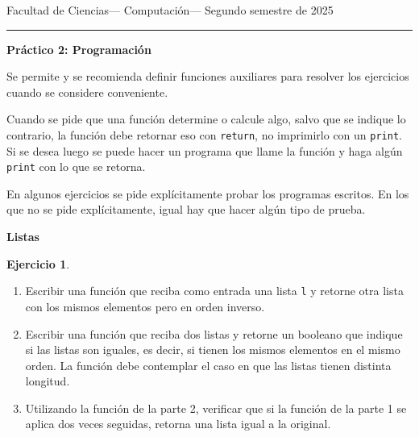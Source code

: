 \documentclass[a4paper,12pt]{book}
\theoremstyle{definition}
\newtheorem{ejercicio}{Ejercicio}
\begin{document}
	
	\noindent
	\centerline{\sc
		Facultad de Ciencias\hfill---\hfill
		Computación\hfill---\hfill
		Segundo semestre de 2025}\smallbreak\hrule
	
	\bigbreak
	\centerline{\Large\textbf{Práctico 2: Programación}}
	\bigbreak
	
	Se permite y se recomienda definir funciones auxiliares para resolver los ejercicios cuando se considere conveniente.
	
	Cuando se pide que una función determine o calcule algo, salvo que se indique lo contrario, la función debe retornar eso con {\tt return}, no imprimirlo con un {\tt print}. Si se desea luego se puede hacer un programa que llame la función y haga algún {\tt print} con lo que se retorna.
	
	En algunos ejercicios se pide explícitamente probar los programas escritos. En los que no se pide explícitamente, igual hay que hacer algún tipo de prueba.
	
	\begin{center}
		{\textbf{Listas}}
	\end{center}
	
	\begin{ejercicio}
		\begin{enumerate}
			\item Escribir una función que reciba como entrada una lista {\tt l} y retorne otra lista con los mismos elementos pero en orden inverso.
			
			\item Escribir una función que reciba dos listas y retorne un booleano que indique si las listas son iguales, es decir, si tienen los mismos elementos en el mismo orden. La función debe contemplar el caso en que las listas tienen distinta longitud.
			
			\item Utilizando la función de la parte 2, verificar que si la función de la parte 1 se aplica dos veces seguidas, retorna una lista igual a la original.
		\end{enumerate}
	\end{ejercicio}
	
\end{document}
